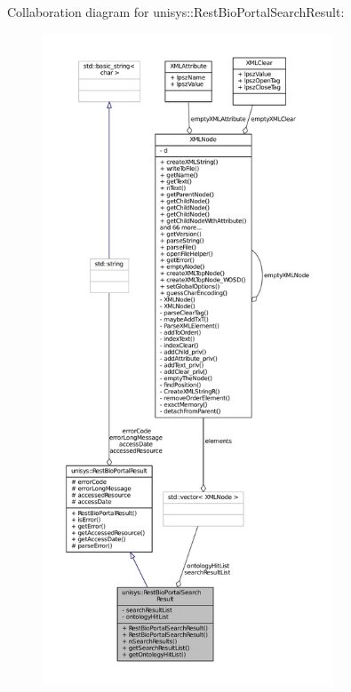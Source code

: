 Collaboration diagram for unisys\-:\-:Rest\-Bio\-Portal\-Search\-Result\-:
\nopagebreak
\begin{figure}[H]
\begin{center}
\leavevmode
\includegraphics[height=550pt]{classunisys_1_1RestBioPortalSearchResult__coll__graph}
\end{center}
\end{figure}
